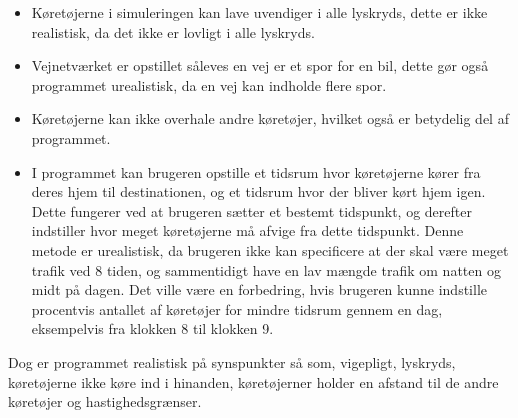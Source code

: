 \begin{itemize}
\item Køretøjerne i simuleringen kan lave uvendiger i alle lyskryds, dette er  ikke realistisk, da det ikke er lovligt i alle lyskryds.
\item Vejnetværket er opstillet såleves en vej er et spor for en bil, dette gør også programmet urealistisk, da en vej kan indholde flere spor.
\item Køretøjerne kan ikke overhale andre køretøjer, hvilket også er betydelig del af programmet.
\item I programmet kan brugeren opstille et tidsrum hvor køretøjerne kører fra deres hjem til destinationen, og et tidsrum hvor der bliver kørt hjem igen. Dette fungerer ved at brugeren sætter et bestemt tidspunkt, og derefter indstiller hvor meget køretøjerne må afvige fra dette tidspunkt. Denne metode er urealistisk, da brugeren ikke kan specificere at der skal være meget trafik ved 8 tiden, og sammentidigt have en lav mængde trafik om natten og midt på dagen. Det ville være en forbedring, hvis brugeren kunne indstille procentvis antallet af køretøjer for mindre tidsrum gennem en dag, eksempelvis fra klokken 8 til klokken 9.
\end{itemize}

\vspace{5mm}
Dog er programmet realistisk på synspunkter så som, vigepligt, lyskryds, køretøjerne ikke køre ind i hinanden, køretøjerner holder en afstand til de andre køretøjer og hastighedsgrænser. 